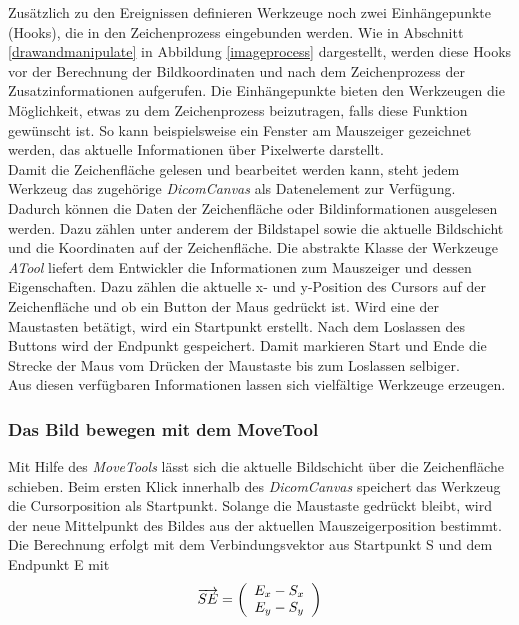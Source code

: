 Zusätzlich zu den Ereignissen definieren Werkzeuge noch zwei Einhängepunkte (Hooks), die in den Zeichenprozess eingebunden werden. Wie in Abschnitt \ref{drawandmanipulate} in Abbildung \ref{imageprocess} dargestellt, werden diese Hooks vor der Berechnung der Bildkoordinaten und nach dem Zeichenprozess der Zusatzinformationen aufgerufen. Die Einhängepunkte bieten den Werkzeugen die Möglichkeit, etwas zu dem Zeichenprozess beizutragen, falls diese Funktion gewünscht ist. So kann beispielsweise ein Fenster am Mauszeiger gezeichnet werden, das aktuelle Informationen über Pixelwerte darstellt.\\
Damit die Zeichenfläche gelesen und bearbeitet werden kann, steht jedem Werkzeug das zugehörige \textit{DicomCanvas} als Datenelement zur Verfügung. Dadurch können die Daten der Zeichenfläche oder Bildinformationen ausgelesen werden. Dazu zählen unter anderem der Bildstapel sowie die aktuelle Bildschicht und die Koordinaten auf der Zeichenfläche. Die abstrakte Klasse der Werkzeuge \textit{ATool} liefert dem Entwickler die Informationen zum Mauszeiger und dessen Eigenschaften. Dazu zählen die aktuelle x- und y-Position des Cursors auf der Zeichenfläche und ob ein Button der Maus gedrückt ist. Wird eine der Maustasten betätigt, wird ein Startpunkt erstellt. Nach dem Loslassen des Buttons wird der Endpunkt gespeichert.
Damit markieren Start und Ende die Strecke der Maus vom Drücken der Maustaste bis zum Loslassen selbiger.\\
Aus diesen verfügbaren Informationen lassen sich vielfältige Werkzeuge erzeugen. 

\subsubsection{Das Bild bewegen mit dem MoveTool}
Mit Hilfe des \textit{MoveTools} lässt sich die aktuelle Bildschicht über die Zeichenfläche schieben. Beim ersten Klick innerhalb des \textit{DicomCanvas} speichert das Werkzeug die Cursorposition als Startpunkt. Solange die Maustaste gedrückt bleibt, wird der neue Mittelpunkt des Bildes aus der aktuellen Mauszeigerposition bestimmt. Die Berechnung erfolgt mit dem Verbindungsvektor aus Startpunkt S und dem Endpunkt E mit 
\begin{equation}
\overrightarrow{SE}=\left(\begin{array}{c} E_x - S_x \\ E_y  - S_y\\ \end{array}\right)
\vspace{0.5cm}
\end{equation}

